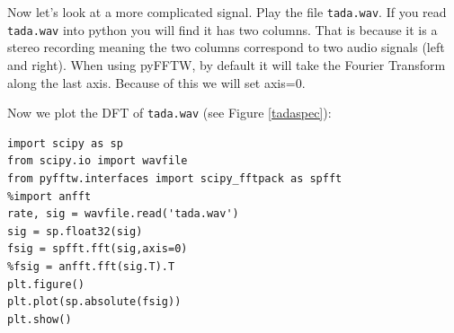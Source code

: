 Now let's look at a more complicated signal. Play the file \texttt{tada.wav}.  If you read \texttt{tada.wav} into python you will find it has two columns.  That is because it is a stereo recording meaning the two columns correspond to two audio signals (left and right).  When using pyFFTW, by default it will take the Fourier Transform along the last axis.  Because of this we will set axis=0. 


Now we plot the DFT of \texttt{tada.wav} (see Figure \ref{tadaspec}):
\begin{lstlisting}
import scipy as sp
from scipy.io import wavfile
from pyfftw.interfaces import scipy_fftpack as spfft
%import anfft
rate, sig = wavfile.read('tada.wav')
sig = sp.float32(sig)
fsig = spfft.fft(sig,axis=0)
%fsig = anfft.fft(sig.T).T
plt.figure()
plt.plot(sp.absolute(fsig))
plt.show()
\end{lstlisting}


